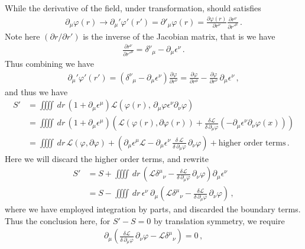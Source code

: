 \documentclass[11pt, onesided]{book}
\theoremstyle{break}
\theoremstyle{break}
\newcommand{\pd}{\partial}
\begin{document}
While the derivative of the field, under transformation, should satisfies
\begin{align*}
\pd_\mu\varphi(r) \to \pd_\mu'\varphi'(r') = \pd'_\mu\varphi(r) = \frac{\pd\varphi(r) }{\pd r^\nu}\frac{\pd r^\nu}{\pd r'^\mu}\,. 
\end{align*}
Note here $(\pd r/\pd r')$ is the inverse of the Jacobian matrix, that is we have
\begin{align*}
\frac{\pd r^\nu}{\pd r'^\mu} = \delta^\nu{}_\mu - \pd_\mu \epsilon^\nu\,.
\end{align*}
Thus combining we have
\begin{align*}
\pd_{\mu}' \varphi'(r') = \left( \delta^{\nu}{}_{\mu} - \pd_\mu \epsilon^\nu \right) \frac{\pd \varphi}{\pd r^\nu} = \frac{\pd \varphi}{\pd r^\mu} - \frac{\pd \varphi }{\pd r^\nu}\, \pd_\mu \epsilon^\nu\,,
\end{align*}
and thus we have
\begin{align*}
S' 
&= \iiiint \, dr\,\left( 1 + \pd_\mu \epsilon^\mu \right) \mathcal{L}\left( \varphi(r) ,\, \pd_\mu \varphi \epsilon^\nu \pd_\nu \varphi\right)\\
&= \iiiint \, dr\, \left( 1 + \pd_\mu \epsilon^\mu \right) \left( \mathcal{L}(\varphi(r), \pd \varphi(r)) + \frac{\delta \mathcal{L}}{\delta\, \pd_\mu \varphi}(-\pd_\mu \epsilon^\nu \pd_\nu \varphi(x) )\right)\\
&= \iiiint \, dr \, \mathcal{L}(\varphi, \pd \varphi) + \left( \pd_\mu \epsilon^\mu \mathcal{L} - \pd_\mu \epsilon^\nu \, \frac{\delta\, \mathcal{L}}{\delta\, \pd_\mu \varphi } \,\pd_\nu \varphi\right)+ \text{higher order terms}\,.
\end{align*}
Here we will discard the higher order terms, and rewrite
\begin{align*}
S' 
&= S + \iiiint \, dr\, \left( \mathcal{L}\delta^\mu{}_\nu - \frac{\delta \mathcal{L}}{\delta \, \pd_\mu \varphi}\,\pd_\nu \varphi\right) \pd_\mu \epsilon^\nu \\
&= S - \iiiint \, dr\, \epsilon^\nu \ \pd_\mu\left( \mathcal{L}\delta^\mu{}_\nu - \frac{\delta \mathcal{L}}{\delta \, \pd_\mu \varphi}\,\pd_\nu \varphi\right)  \tag{*}\,,
\end{align*}
where we have employed integration by parts, and discarded the boundary terms. Thus the conclusion here, for $S' -S = 0$ by translation symmetry, we require
\begin{align}
\pd_\mu\left(\frac{\delta \mathcal{L}}{\delta \, \pd_\mu \varphi}\,\pd_\nu \varphi -  \mathcal{L}\delta^\mu{}_\nu \right) = 0\,,
\end{align}
\end{document}
